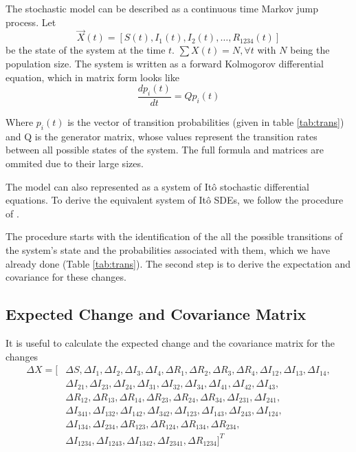 \documentclass[12pt]{article}
\begin{document}
The stochastic model can be described as a continuous time Markov jump process. 
Let
$$\overrightarrow{X}(t) = [S(t), I_1(t), I_2(t), \ldots, R_{1234}(t)]$$ 
be the 
state of the system at the time $t$. $\sum X(t) = N, \forall t$ with $N$ being 
the population size. 
The system is written as a forward Kolmogorov differential equation, which in 
matrix form looks like
\begin{equation}
\frac{dp_i(t)}{dt} = Q p_i(t) 
\end{equation}

Where $p_i(t)$ is  the vector of transition probabilities (given in table 
\ref{tab:trans}) and Q is the generator matrix, whose  values represent the 
transition rates between all possible states of the system. The full formula 
and matrices are ommited due to their large sizes.

The model can also represented as a system of Itô stochastic differential 
equations. To derive the equivalent system of Itô SDEs, we follow the procedure 
of \citet{allen_modeling_2007}. 

The procedure starts with the identification of the all the possible 
transitions of the system's state and the probabilities associated with them, 
which we have already done (Table \ref{tab:trans}). The second step is to 
derive the expectation and covariance for these changes.

\subsection*{Expected Change and Covariance Matrix}

It is useful to calculate the expected change and the covariance matrix for the 
changes 
\begin{align*}
 \Delta X = [&\Delta S, \Delta I_1, \Delta I_2, \Delta I_3, \Delta I_4,
 \Delta R_1, \Delta R_2, \Delta R_3, \Delta R_4, \Delta I_{12}, \Delta I_{13}, 
\Delta I_{14},\\
&\Delta I_{21}, \Delta I_{23}, \Delta I_{24}, \Delta I_{31},\Delta I_{32}, 
\Delta I_{34}, \Delta I_{41}, \Delta I_{42}, \Delta I_{43},\\
&\Delta R_{12}, 
\Delta R_{13}, \Delta R_{14}, \Delta R_{23}, \Delta R_{24}, \Delta R_{34},
\Delta I_{231}, \Delta I_{241},\\ 
&\Delta I_{341}, \Delta I_{132}, \Delta I_{142},\Delta I_{342}, \Delta I_{123}, 
\Delta I_{143}, \Delta I_{243}, \Delta I_{124},\\
&\Delta I_{134}, \Delta I_{234}, \Delta R_{123}, \Delta R_{124}, \Delta R_{134},
\Delta R_{234},\\ 
&\Delta I_{1234}, \Delta I_{1243}, \Delta I_{1342},\Delta I_{2341},\Delta 
R_{1234}]^T
\end{align*}
\end{document}
